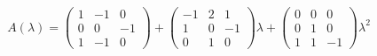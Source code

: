\solution
$$
A(\lambda)=
\begin{pmatrix}
1 & -1 & 0 \\
0 & 0  & -1\\
1 & -1 & 0
\end{pmatrix}
+\begin{pmatrix}
-1 & 2 & 1 \\
1 & 0  & -1\\
0 & 1 & 0
\end{pmatrix}
\lambda
+\begin{pmatrix}
0 & 0 & 0 \\
0 & 1 & 0\\
1 & 1 & -1
\end{pmatrix}\lambda^2
$$

